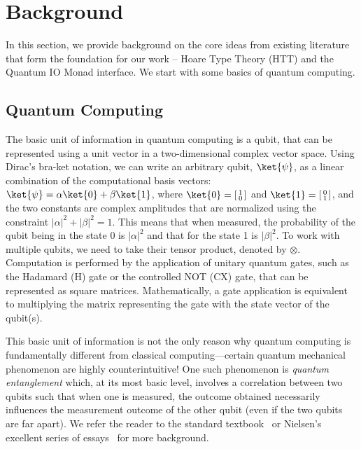 \documentclass[acmsmall,nonacm,timestamp]{acmart}
\begin{document}
\section{Background}
\label{sec:bg}
In this section, we provide background on the core ideas from existing literature that form the foundation for our work -- Hoare Type Theory (HTT) and the Quantum IO Monad interface. We start with some basics of quantum computing.

\subsection{Quantum Computing}
\label{sec:qc}
The basic unit of information in quantum computing is a qubit, that can be represented using a unit vector in a two-dimensional complex vector space. Using Dirac's bra-ket notation, we can write an arbitrary qubit, $\ket{\psi}$, as a linear combination of the computational basis vectors: $\ket{\psi} = \alpha\ket{0} + \beta\ket{1}$, where $\ket{0}=\begin{bsmallmatrix}
1 \\
0
\end{bsmallmatrix}$ and $\ket{1}=\begin{bsmallmatrix}
0 \\
1
\end{bsmallmatrix}$, and the two constants are complex amplitudes that are normalized using the constraint $|\alpha|^2 +|\beta|^2 = 1$. This means that when measured, the probability of the qubit being in the state 0 is $|\alpha|^2$ and that for the state 1 is $|\beta|^2$. To work with multiple qubits, we need to take their tensor product, denoted by $\otimes$. Computation is performed by the application of unitary quantum gates, such as the Hadamard (H) gate or the controlled NOT (CX) gate, that can be represented as square matrices. Mathematically, a gate application is equivalent to multiplying the matrix representing the gate with the state vector of the qubit(s).

This basic unit of information is not the only reason why quantum computing is fundamentally different from classical computing---certain quantum mechanical phenomenon are highly counterintuitive! One such phenomenon is \textit{quantum entanglement} which, at its most basic level, involves a correlation between two qubits such that when one is measured, the outcome obtained necessarily influences the measurement outcome of the other qubit (even if the two qubits are far apart). %
We refer the reader to the standard textbook~\cite{nielsen_quantum_2010} or Nielsen's excellent series of essays~\cite{matuschak2019} for more background.
\end{document}
